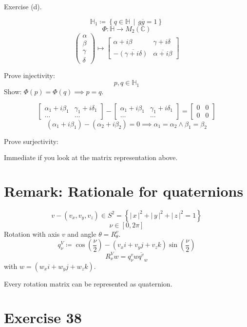 \documentclass[a4paper]{article}
\theoremstyle{definition}
\newcommand\set[1]{\left\{#1\right\}}
\newcommand\setdef[2]{\left\{#1\,\middle|\,#2\right\}}
\newcommand\card[1]{\left|\,#1\,\right|}
\begin{document}
Exercise (d).

\[ \mathbb H_1 \coloneqq \setdef{q \in \mathbb H}{g \overline g = 1} \]
\[ \Phi: \mathbb H \to M_2(\mathbb C) \]
\[
  \begin{pmatrix} \alpha \\ \beta \\ \gamma \\ \delta \end{pmatrix}
  \mapsto \begin{bmatrix}
    \alpha + i \beta & \gamma + i\delta \\
    -\overline{(\gamma + i\delta)} & \overline{\alpha + i\beta}
  \end{bmatrix}
\]

Prove injectivity:
\[ p,q \in \mathbb H_1 \]
Show: $\Phi(p) = \Phi(q) \implies p = q$.

\[
  \begin{bmatrix}
    \alpha_1 + i\beta_1 & \gamma_1 + i\delta_1 \\
    \dots & \dots
  \end{bmatrix} - \begin{bmatrix}
    \alpha_1 + i\beta_1 & \gamma_1 + i\delta_1 \\
    \dots & \dots
  \end{bmatrix}
  = \begin{bmatrix} 0 & 0 \\ 0 & 0 \end{bmatrix}
\] \[
  (\alpha_1 + i \beta_1) - (\alpha_2 + i\beta_2) = 0 \implies \alpha_1 = \alpha_2 \land \beta_1 = \beta_2
\]

Prove surjectivity:

Immediate if you look at the matrix representation above.

\section*{Remark: Rationale for quaternions}

\[ v - (v_x, v_y, v_z) \in S^2 = \set{\card{x}^2 + \card{y}^2 + \card{z}^2 = 1} \]
\[ \nu \in [0,2\pi] \]
Rotation with axis $v$ and angle $\theta = R_{\theta}^v$.
\[ q_{\nu}^V \coloneqq \cos(\frac\nu 2) - (v_x i + v_y j + v_z k) \sin(\frac\nu{2}) \]
\[ R_{\nu}^V w = q_\nu^v w \overline{q^v}_w \]
with $w = (w_x i + w_y j + w_z k)$.

Every rotation matrix can be represented as quaternion.

\section*{Exercise 38}
\end{document}
